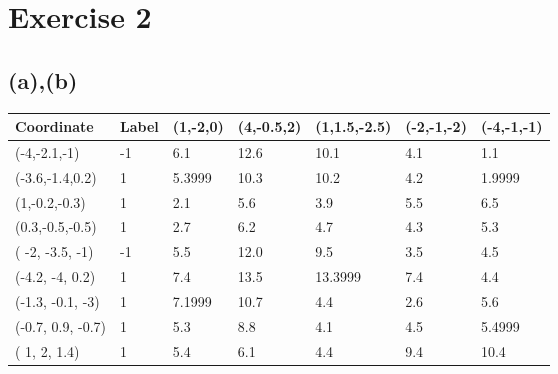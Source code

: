 \documentclass[12pt]{article}
\begin{document}
\section*{Exercise 2}
\subsection*{(a),(b)}
\begin{table}[h!]
\begin{tabular}{lllllll}
\hline
Coordinate           & Label & (1,-2,0)                    & (4,-0.5,2)                  & (1,1.5,-2.5)                & (-2,-1,-2)                  & (-4,-1,-1)                     \\ \hline
(-4,-2.1,-1)         & -1    & 6.1                         & 12.6                        & 10.1                        & \cellcolor[HTML]{FFCC67}4.1                         & \cellcolor[HTML]{FFFE65}1.1    \\
(-3.6,-1.4,0.2)      & 1     & 5.3999                      & 10.3                        & 10.2                        & 4.2 & \cellcolor[HTML]{FFFE65}1.9999 \\
(1,-0.2,-0.3)        & 1     & \cellcolor[HTML]{FFFE65}2.1 & 5.6                         & \cellcolor[HTML]{FFFE65}3.9 & 5.5                         & 6.5                            \\
(0.3,-0.5,-0.5)      & 1     & \cellcolor[HTML]{FFCC67}2.7 & 6.2                         & 4.7                         & 4.3                         & 5.3                            \\
( -2, -3.5, -1)      & -1    & 5.5                         & 12.0                        & 9.5                         & \cellcolor[HTML]{FFFE65}3.5 & 4.5                            \\
(-4.2, -4, 0.2)      & 1     & 7.4                         & 13.5                        & 13.3999                     & 7.4                         & \cellcolor[HTML]{FFCC67}4.4    \\
(-1.3, -0.1, -3)     & 1     & 7.1999                      & 10.7                        & 4.4                         & \cellcolor[HTML]{FFFE65}2.6 & 5.6                            \\
(-0.7, 0.9, -0.7)    & 1     & 5.3                         & 8.8                         & \cellcolor[HTML]{FFCC67}4.1 & 4.5                         & 5.4999                         \\
( 1, 2, 1.4)         & 1     & 5.4                         & 6.1                         & 4.4                         & 9.4                         & 10.4                           \\

\end{tabular}
\end{table}
\end{document}
